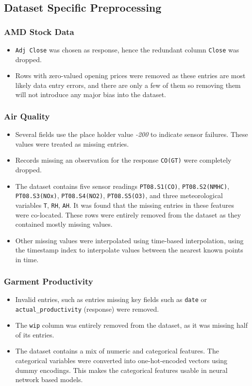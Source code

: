 \documentclass[conference]{IEEEtran}
\begin{document}
\subsection{\textbf{Dataset Specific Preprocessing}}
\subsubsection{\textbf{AMD Stock Data}}
\begin{itemize}
    \item \texttt{Adj Close} was chosen as response, hence the redundant column \texttt{Close} was dropped.
    \item Rows with zero-valued opening prices were removed as these entries are most likely data entry errors, and there are only a few of them so removing them will not introduce any major bias into the dataset.
\end{itemize}

\subsubsection{\textbf{Air Quality}}
\begin{itemize}
    \item Several fields use the place holder value \textit{-200} to indicate sensor failures. These values were treated as missing entries.
    \item Records missing an observation for the response \texttt{CO(GT)} were completely dropped.
    \item The dataset contains five sensor readings \texttt{PT08.S1(CO)}, \texttt{PT08.S2(NMHC)}, \texttt{PT08.S3(NOx)}, \texttt{PT08.S4(NO2)}, \texttt{PT08.S5(O3)}, and three meteorological variables \texttt{T}, \texttt{RH}, \texttt{AH}. It was found that the missing entries in these features were co-located. These rows were entirely removed from the dataset as they contained mostly missing values.
    \item Other missing values were interpolated using time-based interpolation, using the timestamp index to interpolate values between the nearest known points in time.
\end{itemize}

\subsubsection{\textbf{Garment Productivity}}
\begin{itemize}
    \item Invalid entries, such as entries missing key fields such as \texttt{date} or \texttt{actual\_productivity} (response) were removed.
    \item The \texttt{wip} column was entirely removed from the dataset, as it was missing half of its entries.
    \item The dataset contains a mix of numeric and categorical features. The categorical variables were converted into one-hot-encoded vectors using dummy encodings. This makes the categorical features usable in neural network based models.
\end{itemize}
\end{document}
